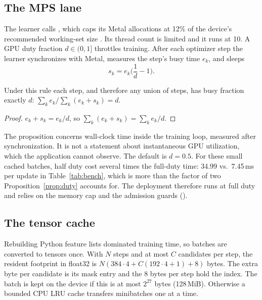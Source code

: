 
\subsection{The MPS lane}
The learner calls
, which caps its Metal
allocations at 12\% of the device's recommended working-set size
\citep{pytorchmps}. Its thread count is limited and it runs at
 10. A GPU duty fraction $d\in(0,1]$ throttles training. After each
optimizer step the learner synchronizes with Metal, measures the step's busy
time $e_k$, and sleeps
\begin{equation}
  s_k=e_k\Big(\frac1d-1\Big).
\end{equation}

\begin{proposition}
\label{prop:duty}
Under this rule each step, and therefore any union of steps, has busy fraction
exactly $d$: $\sum_ke_k/\sum_k(e_k+s_k)=d$.
\end{proposition}
\begin{proof}
$e_k+s_k=e_k/d$, so $\sum_k(e_k+s_k)=\sum_ke_k/d$.
\end{proof}
The proposition concerns wall-clock time inside the training loop, measured
after synchronization. It is not a statement about instantaneous GPU
utilization, which the application cannot observe. The default is $d=0.5$.
For these small cached batches, half duty cost several times the full-duty
time: 34.99 vs.\ 7.45\,ms per update in Table~\ref{tab:bench}, which is more
than the factor of two Proposition~\ref{prop:duty} accounts for. The
deployment therefore runs at full duty and relies on the memory cap and the
admission guards ().

\subsection{The tensor cache}
Rebuilding Python feature lists dominated training time, so batches are
converted to tensors once. With $N$ steps and at most $C$ candidates per step,
the resident footprint in float32 is
$N(384\cdot4+C(192\cdot4+1)+8)$ bytes. The extra byte per candidate is its mask
entry and the 8 bytes per step hold the index. The batch is kept on the device
if this is at most $2^{27}$ bytes (128\,MiB). Otherwise a bounded CPU LRU cache
transfers minibatches one at a time.

